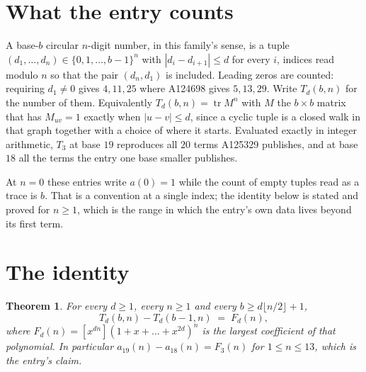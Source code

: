 \documentclass[11pt,a4paper]{article}
\theoremstyle{plain}
\newtheorem{theorem}{Theorem}
\theoremstyle{definition}
\begin{document}
\section{What the entry counts}

A base-$b$ circular $n$-digit number, in this family's sense, is a tuple
$(d_1,\dots,d_n)\in\{0,1,\dots,b-1\}^{n}$ with $|d_i-d_{i+1}|\le d$ for every $i$, indices
read modulo $n$ so that the pair $(d_n,d_1)$ is included. Leading zeros are counted: requiring
$d_1\ne0$ gives $4,11,25$ where A124698 gives $5,13,29$. Write $T_d(b,n)$ for the number of
them. Equivalently $T_d(b,n)=\operatorname{tr}M^{n}$ with $M$ the $b\times b$ matrix that has
$M_{uv}=1$ exactly when $|u-v|\le d$, since a cyclic tuple is a closed walk in that graph
together with a choice of where it starts. Evaluated exactly in integer arithmetic, $T_{3}$
at base $19$ reproduces all $20$ terms A125329 publishes, and at base $18$ all the
terms the entry one base smaller publishes.

At $n=0$ these entries write $a(0)=1$ while the count of empty tuples read as a trace is $b$.
That is a convention at a single index; the identity below is stated and proved for $n\ge1$,
which is the range in which the entry's own data lives beyond its first term.

\section{The identity}

\begin{theorem}
For every $d\ge1$, every $n\ge1$ and every $b\ge d\lfloor n/2\rfloor+1$,
\[
T_d(b,n)-T_d(b-1,n)\;=\;F_d(n),
\]
where $F_d(n)=[x^{dn}](1+x+\dots+x^{2d})^{n}$ is the largest coefficient of that
polynomial. In particular $a_{19}(n)-a_{18}(n)=F_{3}(n)$ for $1\le n\le13$, which
is the entry's claim.
\end{theorem}
\end{document}

